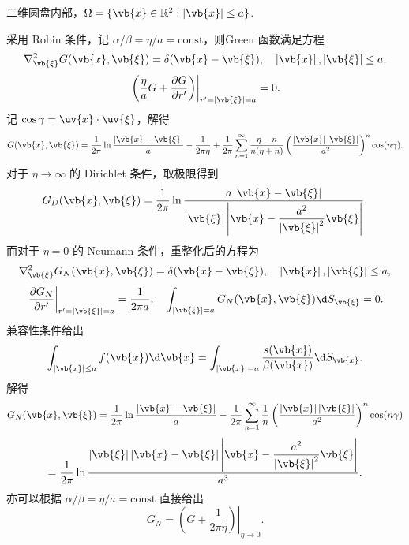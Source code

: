 \begin{example}
	二维圆盘内部，\(\Omega=\{\vb{x}\in\mathbb{R}^2:\left|\vb{x}\right|\leq a\}\).
	
	采用 Robin 条件，记 \(\alpha/\beta=\eta/a=\mathrm{const}\)，则Green 函数满足方程
	\begin{equation*}
		\nabla_{\vb{\xi}}^2G(\vb{x},\vb{\xi})=\delta(\vb{x}-\vb{\xi}),\quad
		\left|\vb{x}\right|,\left|\vb{\xi}\right|\leq a,
	\end{equation*}
	\begin{equation*}
		\left.\left(\frac{\eta}{a}G+\frac{\partial G}{\partial r'}\right)\right|_{r'=\left|\vb{\xi}\right|=a}=0.
	\end{equation*}
	记 \(\cos\gamma=\uv{x}\cdot\uv{\xi}\)，解得
	\begin{equation*}
		G(\vb{x},\vb{\xi})
		=\frac{1}{2\pi}\ln\frac{\left|\vb{x}-\vb{\xi}\right|}{a}-\frac{1}{2\pi\eta}
		+\frac{1}{2\pi}\sum_{n=1}^\infty\frac{\eta-n}{n(\eta+n)}\left(\frac{\left|\vb{x}\right|\left|\vb{\xi}\right|}{a^2}\right)^n\cos(n\gamma).
	\end{equation*}
	对于 \(\eta\to\infty\) 的 Dirichlet 条件，取极限得到
	\begin{equation*}
		G_D(\vb{x},\vb{\xi})
		=\frac{1}{2\pi}\ln\frac{a\left|\vb{x}-\vb{\xi}\right|}{\left|\vb{\xi}\right|\left|\vb{x}-\dfrac{a^2}{\left|\vb{\xi}\right|^2}\vb{\xi}\right|}.
	\end{equation*}
	而对于 \(\eta=0\) 的 Neumann 条件，重整化后的方程为
	\begin{equation*}
		\nabla_{\vb{\xi}}^2G_N(\vb{x},\vb{\xi})=\delta(\vb{x}-\vb{\xi}),\quad
		\left|\vb{x}\right|,\left|\vb{\xi}\right|\leq a,
	\end{equation*}
	\begin{equation*}
		\left.\frac{\partial G_N}{\partial r'}\right|_{r'=\left|\vb{\xi}\right|=a}=\frac{1}{2\pi a},\quad
		\int_{\left|\vb{\xi}\right|=a}G_N(\vb{x},\vb{\xi})\d S_{\vb{\xi}}=0.
	\end{equation*}
	兼容性条件给出
	\begin{equation*}
		\int_{\left|\vb{x}\right|\leq a}f(\vb{x})\d\vb{x}
		=\int_{\left|\vb{x}\right|=a}\frac{s(\vb{x})}{\beta(\vb{x})}\d S_{\vb{x}}.
	\end{equation*}
	解得
	\begin{equation*}
		G_N(\vb{x},\vb{\xi})
		=\frac{1}{2\pi}\ln\frac{\left|\vb{x}-\vb{\xi}\right|}{a}
		-\frac{1}{2\pi}\sum_{n=1}^\infty\frac{1}{n}\left(\frac{\left|\vb{x}\right|\left|\vb{\xi}\right|}{a^2}\right)^n\cos(n\gamma)
	\end{equation*}
	\begin{equation*}
		=\frac{1}{2\pi}\ln\frac{\left|\vb{\xi}\right|\left|\vb{x}-\vb{\xi}\right|\left|\vb{x}-\dfrac{a^2}{\left|\vb{\xi}\right|^2}\vb{\xi}\right|}{a^3}.
	\end{equation*}
	亦可以根据 \(\alpha/\beta=\eta/a=\mathrm{const}\) 直接给出
	\begin{equation*}
		G_N=\left.\left(G+\frac{1}{2\pi\eta}\right)\right|_{\eta\to0}.
	\end{equation*}
\end{example}


